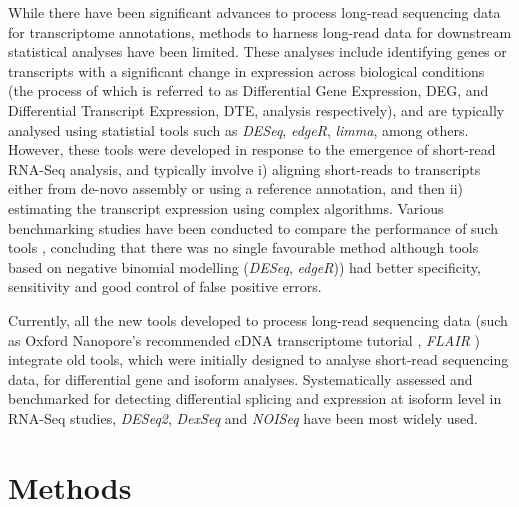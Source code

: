 While there have been significant advances to process long-read sequencing data for transcriptome annotations, methods to harness long-read data for downstream statistical analyses have been limited. These analyses include identifying genes or transcripts with a significant change in expression across biological conditions (the process of which is referred to as Differential Gene Expression, DEG, and Differential Transcript Expression, DTE, analysis respectively), and are typically analysed using statistial tools such as \textit{DESeq}, \textit{edgeR}, \textit{limma}, among others. However, these tools were developed in response to the emergence of short-read RNA-Seq analysis, and typically involve i) aligning short-reads to transcripts either from de-novo assembly or using a reference annotation, and then ii) estimating the transcript expression using complex algorithms. Various benchmarking studies have been conducted to compare the performance of such tools \cite{Teng2016,Rapaport2013}, concluding that there was no single favourable method although tools based on negative binomial modelling (\textit{DESeq}, \textit{edgeR})) had better specificity, sensitivity and good control of false positive errors\cite{Rapaport2013}. 


Currently, all the new tools developed to process long-read sequencing data (such as Oxford Nanopore's recommended cDNA transcriptome tutorial \cite{ONTcdna_transcriptome}, \textit{FLAIR} \cite{Tang2020}) integrate old tools, which were initially designed to analyse short-read sequencing data, for differential gene and isoform analyses. Systematically assessed and benchmarked for detecting differential splicing and expression at isoform level in RNA-Seq studies, \textit{DESeq2}, \textit{DexSeq} and \textit{NOISeq} have been most widely used. 
 

\section{Methods}

